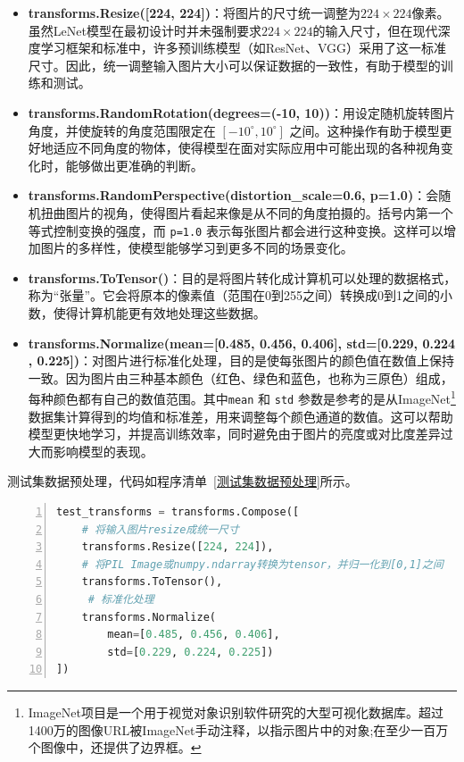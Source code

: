 \begin{itemize}
    \item \textbf{transforms.Resize([224, 224])}：将图片的尺寸统一调整为$224 \times 224$像素。虽然LeNet模型在最初设计时并未强制要求$224 \times 224$的输入尺寸，但在现代深度学习框架和标准中，许多预训练模型（如ResNet、VGG）采用了这一标准尺寸。因此，统一调整输入图片大小可以保证数据的一致性，有助于模型的训练和测试。
    \item \textbf{transforms.RandomRotation(degrees=(-10, 10))}：用设定随机旋转图片角度，并使旋转的角度范围限定在 \([-10^\circ, 10^\circ]\) 之间。这种操作有助于模型更好地适应不同角度的物体，使得模型在面对实际应用中可能出现的各种视角变化时，能够做出更准确的判断。
    \item \textbf{transforms.RandomPerspective(distortion\_scale=0.6, p=1.0)}：会随机扭曲图片的视角，使得图片看起来像是从不同的角度拍摄的。括号内第一个等式控制变换的强度，而 \texttt{p=1.0} 表示每张图片都会进行这种变换。这样可以增加图片的多样性，使模型能够学习到更多不同的场景变化。
    \item \textbf{transforms.ToTensor()}：目的是将图片转化成计算机可以处理的数据格式，称为“张量”。它会将原本的像素值（范围在0到255之间）转换成0到1之间的小数，使得计算机能更有效地处理这些数据。
    \item \textbf{transforms.Normalize(mean=[0.485, 0.456, 0.406], std=[0.229, 0.224\\, 0.225])}：对图片进行标准化处理，目的是使每张图片的颜色值在数值上保持一致。因为图片由三种基本颜色（红色、绿色和蓝色，也称为三原色）组成，每种颜色都有自己的数值范围。其中\texttt{mean} 和 \texttt{std} 参数是参考的是从ImageNet\footnote{ImageNet项目是一个用于视觉对象识别软件研究的大型可视化数据库。超过1400万的图像URL被ImageNet手动注释，以指示图片中的对象;在至少一百万个图像中，还提供了边界框。}数据集计算得到的均值和标准差，用来调整每个颜色通道的数值。这可以帮助模型更快地学习，并提高训练效率，同时避免由于图片的亮度或对比度差异过大而影响模型的表现。
\end{itemize}

测试集数据预处理，代码如程序清单~\ref{测试集数据预处理}所示。
\begin{lstlisting}[language=Python, label={测试集数据预处理}, caption={测试集数据预处理}, basicstyle=\footnotesize\ttfamily, breaklines=true, numbers=left, frame=single,keepspaces=true,showstringspaces=false]
test_transforms = transforms.Compose([
    # 将输入图片resize成统一尺寸
    transforms.Resize([224, 224]), 
    # 将PIL Image或numpy.ndarray转换为tensor，并归一化到[0,1]之间
    transforms.ToTensor(),     
     # 标准化处理
    transforms.Normalize(           
        mean=[0.485, 0.456, 0.406], 
        std=[0.229, 0.224, 0.225])  
])

\end{lstlisting}

